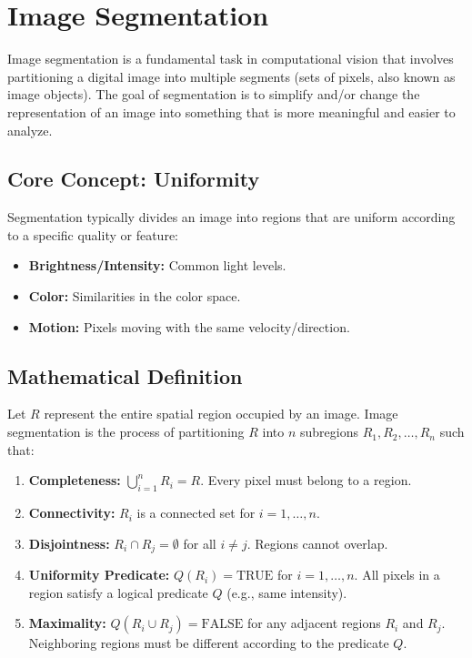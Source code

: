 \documentclass{report}
\begin{document}
\chapter{Image Segmentation}
Image segmentation is a fundamental task in computational vision that involves partitioning a digital image into multiple segments (sets of pixels, also known as image objects).
The goal of segmentation is to simplify and/or change the representation of an image into something that is more meaningful and easier to analyze.

\section{Core Concept: Uniformity}
Segmentation typically divides an image into regions that are uniform according to a specific quality or feature:
\begin{itemize}
    \item \textbf{Brightness/Intensity:} Common light levels.
    \item \textbf{Color:} Similarities in the color space.
    \item \textbf{Motion:} Pixels moving with the same velocity/direction.
\end{itemize}

\section{Mathematical Definition}
Let $R$ represent the entire spatial region occupied by an image. Image segmentation is the process of partitioning $R$ into $n$ subregions $R_1, R_2, \dots, R_n$ such that:

\begin{enumerate}
    \item \textbf{Completeness:} $\bigcup_{i=1}^{n} R_i = R$. Every pixel must belong to a region.
    \item \textbf{Connectivity:} $R_i$ is a connected set for $i=1, \dots, n$.
    \item \textbf{Disjointness:} $R_i \cap R_j = \emptyset$ for all $i \neq j$. Regions cannot overlap.
    \item \textbf{Uniformity Predicate:} $Q(R_i) = \text{TRUE}$ for $i=1, \dots, n$. All pixels in a region satisfy a logical predicate $Q$ (e.g., same intensity).
    \item \textbf{Maximality:} $Q(R_i \cup R_j) = \text{FALSE}$ for any adjacent regions $R_i$ and $R_j$. Neighboring regions must be different according to the predicate $Q$.
\end{enumerate}
\end{document}
